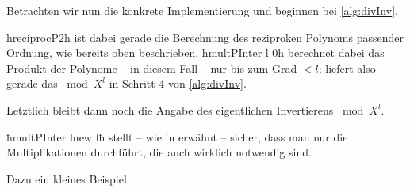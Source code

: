 Betrachten wir nun die konkrete Implementierung und beginnen bei 
\autoref{alg:divInv}.


ħreciprocP2ħ ist dabei gerade die Berechnung des reziproken Polynoms passender
Ordnung, wie bereits oben beschrieben. ħmultPInter l 0ħ berechnet dabei das
Produkt der Polynome -- in diesem Fall -- nur bis zum Grad $<l$; liefert also
gerade das $\bmod X^l$ in Schritt 4 von \autoref{alg:divInv}.


Letztlich bleibt dann noch die Angabe des eigentlichen Invertierens $\bmod
X^l$.


ħmultPInter lnew lħ stellt -- wie in  erwähnt -- sicher, dass 
man nur die Multiplikationen durchführt, die auch wirklich notwendig sind.

Dazu ein kleines Beispiel.

